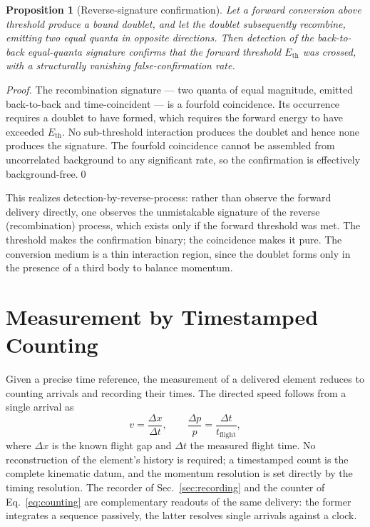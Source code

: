 \documentclass[twocolumn,10pt,a4paper]{article}
\theoremstyle{thmstyle}
\newtheorem{proposition}[theorem]{Proposition}
\theoremstyle{definition}
\theoremstyle{remark}
\begin{document}
\begin{proposition}[Reverse-signature confirmation]
\label{prop:reverse}
Let a forward conversion above threshold produce a bound doublet, and let the
doublet subsequently recombine, emitting two equal quanta in opposite
directions. Then detection of the back-to-back equal-quanta signature confirms
that the forward threshold $E_{\mathrm{th}}$ was crossed, with a
structurally vanishing false-confirmation rate.
\end{proposition}

\begin{proof}
The recombination signature --- two quanta of equal magnitude, emitted
back-to-back and time-coincident --- is a fourfold coincidence. Its occurrence
requires a doublet to have formed, which requires the forward energy to have
exceeded $E_{\mathrm{th}}$. No sub-threshold interaction produces the doublet
and hence none produces the signature. The fourfold coincidence cannot be
assembled from uncorrelated background to any significant rate, so the
confirmation is effectively background-free.\qed
\end{proof}

This realizes detection-by-reverse-process: rather than observe the forward
delivery directly, one observes the unmistakable signature of the reverse
(recombination) process, which exists only if the forward threshold was met.
The threshold makes the confirmation binary; the coincidence makes it pure.
The conversion medium is a thin interaction region, since the doublet forms
only in the presence of a third body to balance momentum.

\section{Measurement by Timestamped Counting}
\label{sec:counting}

Given a precise time reference, the measurement of a delivered element reduces
to counting arrivals and recording their times. The directed speed follows
from a single arrival as
\begin{equation}
v = \frac{\Delta x}{\Delta t},
\qquad
\frac{\Delta p}{p} = \frac{\Delta t}{t_{\mathrm{flight}}},
\label{eq:counting}
\end{equation}
where $\Delta x$ is the known flight gap and $\Delta t$ the measured flight
time. No reconstruction of the element's history is required; a timestamped
count is the complete kinematic datum, and the momentum resolution is set
directly by the timing resolution. The recorder of Sec.~\ref{sec:recording}
and the counter of Eq.~\eqref{eq:counting} are complementary readouts of the
same delivery: the former integrates a sequence passively, the latter resolves
single arrivals against a clock.
\end{document}
